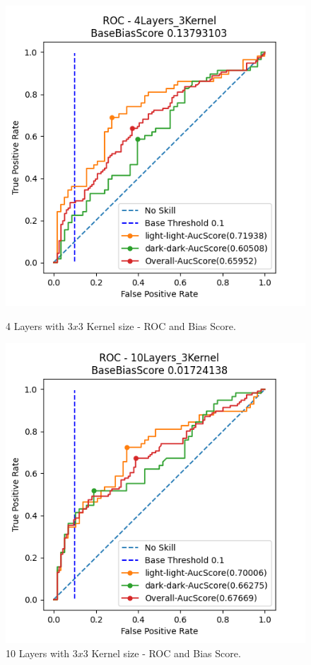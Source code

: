 \documentclass[conference]{IEEEtran}
\begin{document}
\begin{figure}[hbt!]\captionsetup[subfigure]{font=footnotesize}
  \centering
  \begin{minipage}{.45\columnwidth}
    \centering
    \includegraphics[width=\linewidth]{code/compiling_results/output_images/4Layers_3Kernel.png}
    \caption{4 Layers with $3x3$ Kernel size - ROC and Bias Score.}
    \label{10layers_3_roc}
  \end{minipage}%
  \hfill
  \begin{minipage}{.45\columnwidth}
    \centering
    \includegraphics[width=\linewidth]{code/compiling_results/output_images/10Layers_3Kernel.png}
    \caption{10 Layers with $3x3$ Kernel size - ROC and Bias Score.}
    \label{4layers_3_roc}
  \end{minipage}%
\end{figure}
\end{document}
